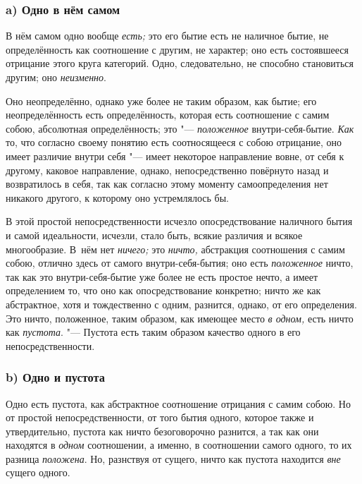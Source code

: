 \subsubsection[a) Одно в нём самом]{\centering a) Одно в нём самом}

В нём самом одно вообще {\em есть;} это его бытие есть
не наличное бытие, не определённость как соотношение с другим, не характер;
оно есть состоявшееся отрицание этого круга категорий. Одно, следовательно,
не способно становиться другим; оно {\em неизменно}.

Оно неопределённо, однако уже более не таким образом, как бытие; его
неопределённость есть определённость, которая есть соотношение с самим
собою, абсолютная определённость; это
"--- {\em положенное} внутри-себя-бытие.
{\em Как} то, что согласно своему понятию есть
соотносящееся с собою отрицание, оно имеет различие внутри себя "--- имеет
некоторое направление вовне, от себя к другому, каковое направление,
однако, непосредственно повёрнуто назад и возвратилось в себя, так как
согласно этому моменту самоопределения нет никакого другого, к которому оно
устремлялось бы.

В этой простой непосредственности исчезло опосредствование наличного бытия и
самой идеальности, исчезли, стало быть, всякие различия и всякое
многообразие. В~нём нет {\em ничего;} это
{\em ничто,} абстракция соотношения с самим собою,
отлично здесь от самого внутри-себя-бытия; оно есть
{\em положенное} ничто, так как это внутри-себя-бытие
уже более не есть простое нечто, а имеет определением то, что оно как
опосредствование конкретно; ничто же как абстрактное, хотя и тождественно с
одним, разнится, однако, от его определения. Это ничто, положенное, таким
образом, как имеющее место {\em в одном,} есть ничто
как {\em пустота}. "--- Пустота есть таким образом
качество одного в его непосредственности.

\subsubsection[b) Одно и пустота]{\centering b) Одно и пустота}

Одно есть пустота, как абстрактное соотношение отрицания с самим собою. Но
от простой непосредственности, от того бытия одного, которое также и
утвердительно, пустота как ничто безоговорочно разнится, а так как они
находятся в {\em одном} соотношении, а именно, в
соотношении самого одного, то их разница
{\em положена}. Но, разнствуя от сущего, ничто как
пустота находится {\em вне} сущего одного.

